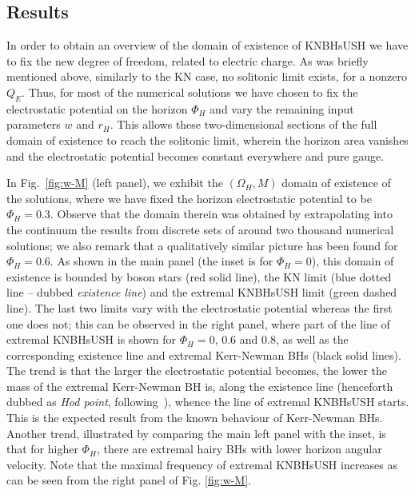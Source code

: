 \subsection{Results }
\label{sec_results_u}

In order to obtain an overview of the domain of existence of KNBHsUSH we have to fix the new degree of freedom, related to electric charge. 
As was briefly mentioned above, similarly to the
KN case, no solitonic limit exists, for a nonzero $Q_E$.
Thus, for most of the numerical solutions we have chosen to fix the electrostatic potential on the horizon $\Phi_H$
and vary the remaining  input parameters $w$ and $r_H$.
This allows these  two-dimensional sections of the full domain of existence to reach the solitonic limit, 
wherein the horizon area vanishes and the electrostatic potential becomes constant everywhere and pure gauge.


 In Fig.~\ref{fig:w-M} (left panel), 
we exhibit the $(\Omega_H,M)$ domain of existence of the solutions, where we have fixed the horizon electrostatic potential to be $\Phi_H=0.3$. Observe that the domain therein was obtained by extrapolating into the continuum
the results from discrete sets of around two thousand numerical solutions; we also remark that a qualitatively similar picture has been found for $\Phi_H=0.6$.
 As shown in the main panel (the inset is for $\Phi_H=0$), 
this domain of existence is bounded by boson stars (red solid line), 
the KN limit (blue dotted line -- dubbed \textit{existence line}) 
and the extremal KNBHsUSH limit (green dashed line). 
The last two limits vary with the electrostatic potential whereas the first one does not; 
this can be observed in the right panel, where part of the line of extremal KNBHsUSH is shown for $\Phi_H=0$, $0.6$ and $0.8$, as well as the corresponding existence line and extremal Kerr-Newman BHs (black solid lines). 
The trend is that the larger the electrostatic potential becomes, the lower the mass of the extremal Kerr-Newman BH is, along the existence line (henceforth dubbed as \textit{Hod point}, following~\cite{Herdeiro:2015tia}), whence the line of extremal KNBHsUSH starts. This is the expected result from the known behaviour of Kerr-Newman BHs. Another trend, illustrated by comparing the main left panel with the inset, is that for higher $\Phi_H$, there are extremal hairy BHs with lower horizon angular velocity.
Note that the maximal frequency of extremal KNBHsUSH increases as can be seen from the right panel of Fig. \ref{fig:w-M}.

